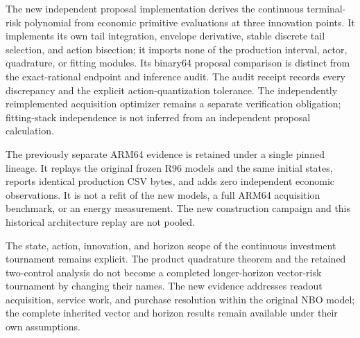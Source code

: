 The new independent proposal implementation derives the continuous terminal-risk polynomial from economic primitive evaluations at three innovation points. It implements its own tail integration, envelope derivative, stable discrete tail selection, and action bisection; it imports none of the production interval, actor, quadrature, or fitting modules. Its binary64 proposal comparison is distinct from the exact-rational endpoint and inference audit. The audit receipt records every discrepancy and the explicit action-quantization tolerance. The independently reimplemented acquisition optimizer remains a separate verification obligation; fitting-stack independence is not inferred from an independent proposal calculation.

The previously separate ARM64 evidence is retained under a single pinned lineage. It replays the original frozen R96 models and the same initial states, reports identical production CSV bytes, and adds zero independent economic observations. It is not a refit of the new models, a full ARM64 acquisition benchmark, or an energy measurement. The new construction campaign and this historical architecture replay are not pooled.

The state, action, innovation, and horizon scope of the continuous investment tournament remains explicit. The product quadrature theorem and the retained two-control analysis do not become a completed longer-horizon vector-risk tournament by changing their names. The new evidence addresses readout acquisition, service work, and purchase resolution within the original NBO model; the complete inherited vector and horizon results remain available under their own assumptions.
